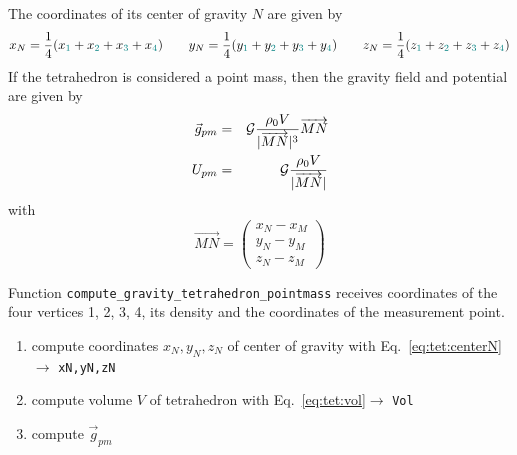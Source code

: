 \begin{center}
\end{center}


The coordinates of its center of gravity $N$ are given 
by 
\begin{equation}
x_N= \frac{1}{4}(x_{\color{teal}1}+x_{\color{teal}2}+x_{\color{teal}3}+x_{\color{teal}4})
\qquad
y_N= \frac{1}{4}(y_{\color{teal}1}+y_{\color{teal}2}+y_{\color{teal}3}+y_{\color{teal}4})
\qquad
z_N= \frac{1}{4}(z_{\color{teal}1}+z_{\color{teal}2}+z_{\color{teal}3}+z_{\color{teal}4})
\label{eq:tet:centerN}
\end{equation}
If the tetrahedron is considered a point mass, then 
the gravity field and potential are given by
\begin{eqnarray}
\vec{g}_{pm} &=& {\cal G}  \frac{\rho_0 V}{|\overrightarrow{MN}|^3} \overrightarrow{MN}
\\
U_{pm} &=& {\cal G}  \frac{\rho_0 V}{|\overrightarrow{MN}|} 
\end{eqnarray}
with 
\[
\overrightarrow{MN} =
\left(
\begin{array}{c}
x_N - x_M \\
y_N - y_M \\
z_N - z_M 
\end{array}
\right)
\]

Function \verb|compute_gravity_tetrahedron_pointmass| receives coordinates of the four 
vertices {\color{teal}1}, {\color{teal}2}, {\color{teal}3}, {\color{teal}4},  its 
density and the coordinates of the measurement point.

\begin{enumerate}
\item compute coordinates $x_N,y_N,z_N$ of center of gravity with Eq.~\eqref{eq:tet:centerN}
$\rightarrow$ \verb|xN,yN,zN|

\item compute volume $V$ of tetrahedron with Eq.~\ref{eq:tet:vol}$ \rightarrow$ \verb|Vol| 
\item compute $\vec{g}_{pm}$
\end{enumerate}

